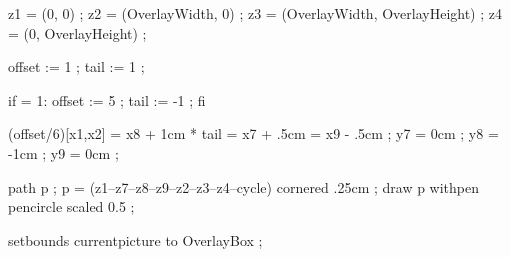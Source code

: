 %
%

%
%
  z1 = (0, 0) ;
  z2 = (OverlayWidth, 0) ;
  z3 = (OverlayWidth, OverlayHeight) ;
  z4 = (0, OverlayHeight) ;

  offset := 1 ;
  tail := 1 ;

  if  = 1:
    offset := 5 ;
    tail := -1 ;
  fi

  (offset/6)[x1,x2] = x8 + 1cm * tail = x7 + .5cm = x9 - .5cm ;
  y7 =  0cm ;
  y8 = -1cm ;
  y9 =  0cm ;

  path p ;
  p = (z1--z7--z8--z9--z2--z3--z4--cycle) cornered .25cm ;
  draw p withpen pencircle scaled 0.5 ;

  setbounds currentpicture to OverlayBox ;
\stopuseMPgraphic






